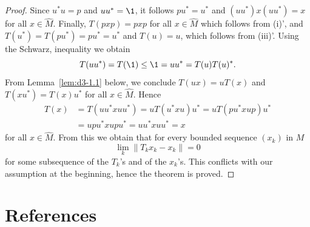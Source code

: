 \begin{proof}
Since $u^{*}u = p$ and $uu^{*} = \1$, it follows $pu^{*} = u^{*}$ and $(uu^{*})x(uu^{*}) = x$ for all $x \in \widehat{M}$.
Finally, $T(pxp) = pxp$ for all $x \in \widehat{M}$ which follows from \upshape(i)', and $T(u^{*}) = T(pu^{*}) = pu^{*} = u^{*}$ and $T(u) = u$, which follows from \upshape(iii)'.
Using the Schwarz, inequality we obtain
\[
	T(uu^{*}) = T(\1) \leq \1 = uu^{*} = T(u)T(u)^{*}.
\]
From Lemma~\ref{lem:d3-1.1} below, we conclude $T(ux) = uT(x)$ and $T(xu^{*}) = T(x)u^{*}$ for all $x \in \widehat{M}$.
Hence
\begin{align*}
T(x) &= T(uu^{*}xuu^{*}) = uT(u^{*}xu)u^{*} = uT(pu^{*}xup)u^{*} \\
&= upu^{*}xupu^{*} = uu^{*}xuu^{*} = x
\end{align*}
for all $x \in \widehat{M}$.
From this we obtain that for every bounded sequence $(x_{k})$ in $M$
\[
	\lim_k \|T_k x_{k} - x_{k}\| = 0
\]
for some subsequence of the $T_{k}$'s and of the $x_{k}$'s.
This conflicts with our assumption at the beginning, hence the theorem is proved.
\end{proof}
\section*{References}
{\RaggedRight
  \printbibliography[heading=none]
 }